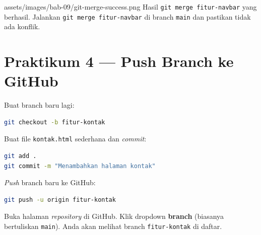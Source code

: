 \begin{tangkapanlayar}
  {assets/images/bab-09/git-merge-success.png}
  {Hasil \texttt{git merge fitur-navbar} yang berhasil.}
  {Jalankan \texttt{git merge fitur-navbar} di branch \texttt{main} dan pastikan tidak ada konflik.}
\end{tangkapanlayar}

\section{Praktikum 4 --- Push Branch ke GitHub}
\label{sec:praktik-push-branch}

\begin{langkah}
  \item Buat branch baru lagi:
\end{langkah}

\begin{lstlisting}[language=bash, caption={Membuat branch fitur-kontak}, label={lst:git-branch-kontak}]
git checkout -b fitur-kontak
\end{lstlisting}

\begin{langkah}
  \item Buat file \texttt{kontak.html} sederhana dan \emph{commit}:
\end{langkah}

\begin{lstlisting}[language=bash, caption={Commit file kontak}, label={lst:git-commit-kontak}]
git add .
git commit -m "Menambahkan halaman kontak"
\end{lstlisting}

\begin{langkah}
  \item \emph{Push} branch baru ke GitHub:
\end{langkah}

\begin{lstlisting}[language=bash, caption={Push branch fitur-kontak ke GitHub}, label={lst:git-push-kontak}]
git push -u origin fitur-kontak
\end{lstlisting}

\begin{langkah}
  \item Buka halaman \emph{repository} di GitHub. Klik dropdown \textbf{branch} (biasanya bertuliskan \texttt{main}). Anda akan melihat branch \texttt{fitur-kontak} di daftar.
\end{langkah}

